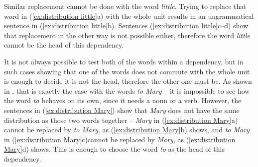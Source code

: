 \begin{exe}
    \ex
    \label{ex:distribution boy}
    \begin{xlist}
    \end{xlist}
\end{exe}

Similar replacement cannot be done with the word \textsl{little}. Trying to replace that word in (\ref{ex:distribution little}a) with the whole unit results in an ungrammatical sentence in (\ref{ex:distribution little}b). Sentences (\ref{ex:distribution little}c--d) show that replacement in the other way is not possible either, therefore the word \textsl{little} cannot be the head of this dependency.

\begin{exe}
    \ex
    \label{ex:distribution little}
	\begin{xlist}
    \end{xlist}
\end{exe}

It is not always possible to test both of the words within a dependency, but in such cases showing that one of the words does not commute with the whole unit is enough to decide it is not the head, therefore the other one must be. As shown in \cite{gerdes-etal-2018-sud}, that is exactly the case with the words \textsl{to Mary} -- it is impossible to see how the word \textsl{to} behaves on its own, since it needs a noun or a verb. However, the sentences in (\ref{ex:distribution Mary}) show that \textsl{Mary} does not have the same distribution as those two words together -- \textsl{Mary} in (\ref{ex:distribution Mary}a) cannot be replaced by \textsl{to Mary}, as (\ref{ex:distribution Mary}b) shows, and \textsl{to Mary} in (\ref{ex:distribution Mary}c)cannot be replaced by \textsl{Mary}, as (\ref{ex:distribution Mary}d) shows. This is enough to choose the word \textsl{to} as the head of this dependency.

\begin{exe}
    \ex
    \label{ex:distribution Mary}
    \begin{xlist}
    \end{xlist}
\end{exe}

